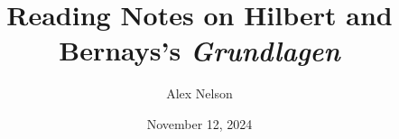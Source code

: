 \documentclass{book}
\title{Reading Notes on Hilbert and Bernays's \emph{Grundlagen}}
\author{Alex Nelson}
\date{November 12, 2024}
\begin{document}
\frontmatter
\maketitle
\tableofcontents


\mainmatter




\backmatter\nocite{*}
{\footnotesize %

}
\end{document}
